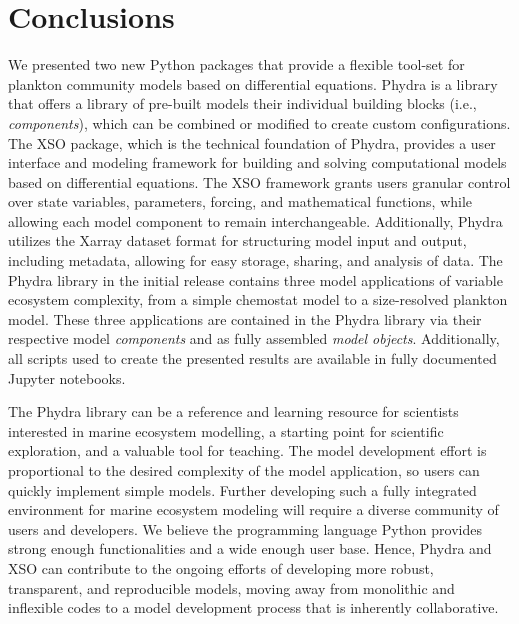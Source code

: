 \documentclass[gmd, manuscript]{copernicus}
\begin{document}
\section{Conclusions}

We presented two new Python packages that provide a flexible tool-set for plankton community models based on differential equations. Phydra is a library that offers a library of pre-built models their individual building blocks (i.e., \textit{components}), which can be combined or modified to create custom configurations. The XSO package, which is the technical foundation of Phydra, provides a user interface and modeling framework for building and solving computational models based on differential equations. The XSO framework grants users granular control over state variables, parameters, forcing, and mathematical functions, while allowing each model component to remain interchangeable. Additionally, Phydra utilizes the Xarray dataset format for structuring model input and output, including metadata, allowing for easy storage, sharing, and analysis of data. The Phydra library in the initial release contains three model applications of variable ecosystem complexity, from a simple chemostat model to a size-resolved plankton model. These three applications are contained in the Phydra library via their respective model \textit{components} and as fully assembled \textit{model objects}. Additionally, all scripts used to create the presented results are available in fully documented Jupyter notebooks.

The Phydra library can be a reference and learning resource for scientists interested in marine ecosystem modelling, a starting point for scientific exploration, and a valuable tool for teaching. The model development effort is proportional to the desired complexity of the model application, so users can quickly implement simple models. Further developing such a fully integrated environment for marine ecosystem modeling will require a diverse community of users and developers. We believe the programming language Python provides strong enough functionalities and a wide enough user base. Hence, Phydra and XSO can contribute to the ongoing efforts of developing more robust, transparent, and reproducible models, moving away from monolithic and inflexible codes to a model development process that is inherently collaborative.
\end{document}
